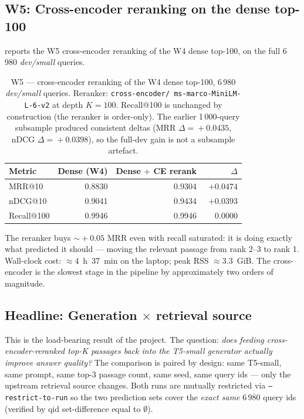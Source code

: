 \documentclass[11pt,a4paper]{article}
\makeatletter
\newcommand{\devsmall}{\textit{dev/small}}
\newcommand{\fdev}{6\,980}
\newcommand{\mrr}{MRR@10}
\newcommand{\ndcg}{nDCG@10}
\newcommand{\recallH}{Recall@100}
\makeatother
\begin{document}
\subsection{W5: Cross-encoder reranking on the dense top-100}
\label{sec:w5-dense-rerank}

 reports the W5 cross-encoder reranking of the
W4 dense top-100, on the full \fdev{} \devsmall{} queries.

\begin{table}[H]
  \centering
  \caption{W5 --- cross-encoder reranking of the W4 dense top-100,
  \fdev{} \devsmall{} queries.  Reranker: \texttt{cross-encoder/
  ms-marco-MiniLM-L-6-v2} at depth $K\!=\!100$.  Recall@100 is
  unchanged by construction (the reranker is order-only).  The
  earlier 1\,000-query subsample produced consistent deltas
  (MRR $\Delta\!=\!+0.0435$, nDCG $\Delta\!=\!+0.0398$), so the
  full-dev gain is not a subsample artefact.}
  \label{tab:w5-results}
  \begin{tabular}{lrrr}
    \toprule
    Metric        & Dense (W4) & Dense $+$ CE rerank & $\Delta$ \\
    \midrule
    \mrr{}        & 0.8830 & 0.9304 & $\mathbf{+0.0474}$ \\
    \ndcg{}       & 0.9041 & 0.9434 & $+0.0393$ \\
    \recallH{}    & 0.9946 & 0.9946 & $\phantom{+}0.0000$ \\
    \bottomrule
  \end{tabular}
\end{table}

The reranker buys $\sim\!+0.05$ MRR even with recall saturated: it
is doing exactly what  predicted it should ---
moving the relevant passage from rank 2--3 to rank 1.  Wall-clock
cost: $\approx 4$~h~$37$~min on the laptop;
peak RSS $\approx 3.3$~GiB.  The cross-encoder is the slowest stage
in the pipeline by approximately two orders of magnitude.

\subsection{Headline: Generation $\times$ retrieval source}
\label{sec:gen-x-retrieval}

This is the load-bearing result of the project.  The question:
\emph{does feeding cross-encoder-reranked top-K passages back into
the T5-small generator actually improve answer quality?}  The
comparison is paired by design: same T5-small, same prompt, same
top-3 passage count, same seed, same query ids --- only the
upstream retrieval source changes.  Both runs are mutually
restricted via \texttt{--restrict-to-run} so the two prediction
sets cover the \emph{exact same} \fdev{} query ids (verified by
qid set-difference equal to $\emptyset$).
\end{document}
